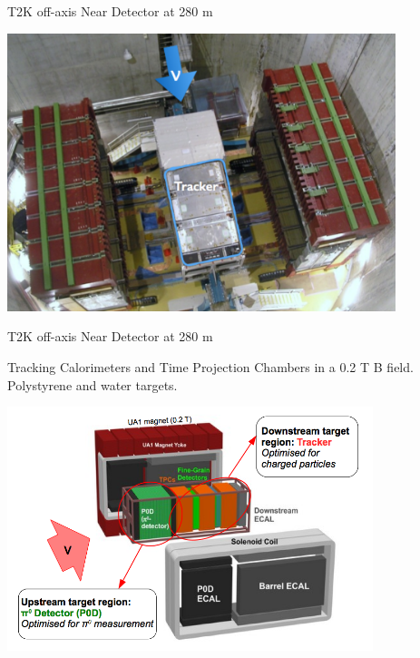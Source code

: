 %
%
%
\begin{frame}{T2K off-axis Near Detector at 280 m}

  \begin{center}
   \includegraphics[width=0.85\textwidth]{./images/3nu/accelerator/t2k/nd280_photo.png}
  \end{center}

\end{frame}

%
%
%
\begin{frame}{T2K off-axis Near Detector at 280 m}

{\small
Tracking Calorimeters and Time Projection Chambers in a 0.2 T B field.\\
Polystyrene and water targets.}

\begin{center}
  \includegraphics[width=0.80\textwidth]{./images/3nu/accelerator/t2k/nd280_schematic.png}
\end{center}

\end{frame}

